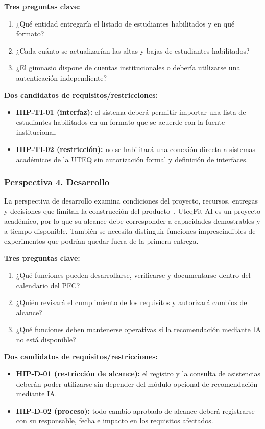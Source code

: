 \textbf{Tres preguntas clave:}
\begin{enumerate}
\item ¿Qué entidad entregaría el listado de estudiantes habilitados y en qué formato?
\item ¿Cada cuánto se actualizarían las altas y bajas de estudiantes habilitados?
\item ¿El gimnasio dispone de cuentas institucionales o debería utilizarse una autenticación independiente?
\end{enumerate}
\textbf{Dos candidatos de requisitos/restricciones:}
\begin{itemize}
\item \textbf{HIP-TI-01 (interfaz):} el sistema deberá permitir importar una lista de estudiantes habilitados en un formato que se acuerde con la fuente institucional.
\item \textbf{HIP-TI-02 (restricción):} no se habilitará una conexión directa a sistemas académicos de la UTEQ sin autorización formal y definición de interfaces.
\end{itemize}

\subsubsection{Perspectiva 4. Desarrollo}
La perspectiva de desarrollo examina condiciones del proyecto, recursos, entregas y decisiones que limitan la construcción del producto~\cite{pohl2025}. UteqFit-AI es un proyecto académico, por lo que su alcance debe corresponder a capacidades demostrables y a tiempo disponible. También se necesita distinguir funciones imprescindibles de experimentos que podrían quedar fuera de la primera entrega.

\textbf{Tres preguntas clave:}
\begin{enumerate}
\item ¿Qué funciones pueden desarrollarse, verificarse y documentarse dentro del calendario del PFC?
\item ¿Quién revisará el cumplimiento de los requisitos y autorizará cambios de alcance?
\item ¿Qué funciones deben mantenerse operativas si la recomendación mediante IA no está disponible?
\end{enumerate}
\textbf{Dos candidatos de requisitos/restricciones:}
\begin{itemize}
\item \textbf{HIP-D-01 (restricción de alcance):} el registro y la consulta de asistencias deberán poder utilizarse sin depender del módulo opcional de recomendación mediante IA.
\item \textbf{HIP-D-02 (proceso):} todo cambio aprobado de alcance deberá registrarse con su responsable, fecha e impacto en los requisitos afectados.
\end{itemize}

